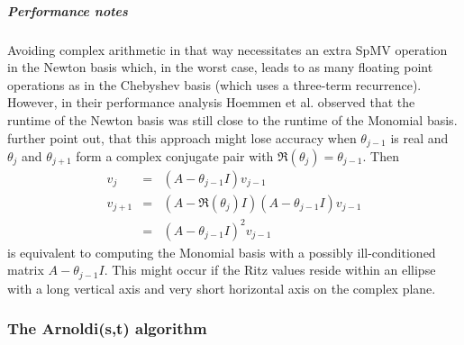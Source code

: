 \documentclass{scrartcl}
\numberwithin{equation}{section}
\begin{document}
\subparagraph{Performance notes}
Avoiding complex arithmetic in that way necessitates an extra SpMV operation in the Newton basis which, in the worst case, leads to as many floating point operations as in the Chebyshev basis (which uses a three-term recurrence). However, in their performance analysis Hoemmen et al. \cite{Hoemmen:2010:CKS:1970638} observed that the runtime of the Newton basis was still close to the runtime of the Monomial basis.\\
\cite{Hoemmen:2010:CKS:1970638} further point out, that this approach might lose accuracy when $\theta_{j - 1}$ is real and $\theta_j$ and $\theta_{j + 1}$ form a complex conjugate pair with $\Re(\theta_j) = \theta_{j - 1} $. Then
\begin{eqnarray*}
v_j &=& (A - \theta_{j - 1} I )v_{j - 1} \\
v_{j + 1} &=& (A - \Re(\theta_j) I )(A - \theta_{j - 1} I )v_{j - 1} \\
		  &=& (A - \theta_{j - 1} I )^2v_{j - 1}
\end{eqnarray*}
is equivalent to computing the Monomial basis with a possibly ill-conditioned  matrix $A - \theta_{j - 1} I$. This might occur if the Ritz values reside within an ellipse with a long vertical axis and very short horizontal axis on the complex plane.

\subsubsection{The Arnoldi(s,t) algorithm}
\end{document}
